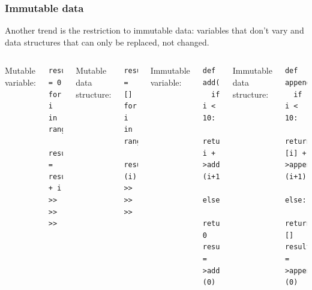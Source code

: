\documentclass{beamer}
\begin{document}
\begin{frame}[fragile]
\frametitle{Immutable data}

Another trend is the restriction to immutable data: variables that don't vary and data structures that can only be replaced, not changed.

\vspace{0.5 cm}
\begin{columns}
Mutable variable:

\begin{lstlisting}[frame=single]
result = 0
for i in range(10):
  result = result + i
>>
>>
>>
\end{lstlisting}

\vspace{0.3 cm}
Mutable data structure:

\begin{lstlisting}[frame=single]
result = []
for i in range(10):
  result.>append>(i)
>>
>>
>>
\end{lstlisting}

Immutable variable:

\begin{lstlisting}[frame=single]
def add(i):
  if i < 10:
    return i + >add>(i+1)
  else:
    return 0
result = >add>(0)
\end{lstlisting}

\vspace{0.3 cm}
Immutable data structure:

\begin{lstlisting}[frame=single]
def appended(i):
  if i < 10:
    return [i] + >appended>(i+1)
  else:
    return []
result = >appended>(0)
\end{lstlisting}
\end{columns}
\end{frame}
\end{document}
